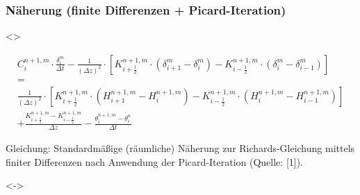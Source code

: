 \documentclass[xcolor=dvipsnames]{beamer}
\newcommand{\mycaption}[1]{\tiny\raggedright{#1}}
\newcounter{firstElement}
\newcounter{secondElement}
\begin{document}
\begin{frame}
  \frametitle{Näherung (finite Differenzen + Picard-Iteration)}
  \only<\thefirstElement>{
    \vspace{-5mm}
    \begin{gather*}
      C_i^{n+1,m} \cdot \frac{\delta_i^m}{\Delta t} - \frac{1}{\left(\Delta z\right)^2} \cdot \left[K_{i+\frac{1}{2}}^{n+1,m} \cdot \left(\delta_{i+1}^m - \delta_i^m\right) - K_{i-\frac{1}{2}}^{n+1,m} \cdot \left(\delta_i^m - \delta_{i-1}^m\right)\right] \\[+0.5mm]
      = \\[+0.5mm]
      \frac{1}{\left(\Delta z\right)^2} \cdot \left[K_{i+\frac{1}{2}}^{n+1,m} \cdot \left(H_{i+1}^{n+1,m} - H_i^{n+1,m}\right) - K_{i-\frac{1}{2}}^{n+1,m} \cdot \left(H_{i}^{n+1,m} - H_{i-1}^{n+1,m}\right)\right] \\[+0.5mm]
      + \frac{K_{i+\frac{1}{2}}^{n+1,m} - K_{i-\frac{1}{2}}^{n+1,m}}{\Delta z} - \frac{\theta_i^{n+1,m}-\theta_i^{n}}{\Delta t}
    \end{gather*}
      \begin{minipage}{1.0\textwidth}
        \mycaption{Gleichung: Standardmäßige (räumliche) Näherung zur Richards-Gleichung mittels finiter Differenzen nach Anwendung der Picard-Iteration (Quelle: [1]).}
      \end{minipage}
    \vspace{-7mm}}
  \only<\thesecondElement->{
    \vspace{-5mm}
    \begin{gather*}

\end{gather*}}
\end{frame}
\end{document}
